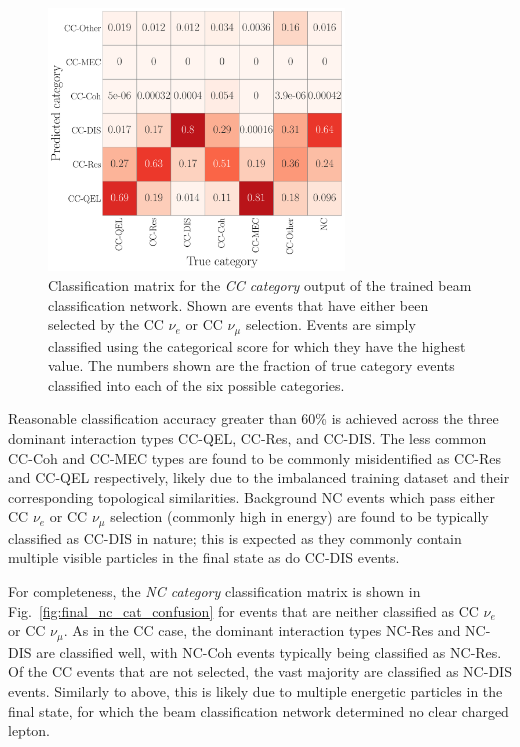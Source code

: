 \begin{figure} %
    \includegraphics[width=0.7\textwidth]{diagrams/7-results/final_cc_cat_confusion.pdf}
    \caption[Classification matrix for the CC category output of the beam classification network]
    {Classification matrix for the \emph{CC category} output of the trained beam classification
        network. Shown are events that have either been selected by the CC $\nu_{e}$ or CC
        $\nu_{\mu}$ selection. Events are simply classified using the categorical score for which
        they have the highest value. The numbers shown are the fraction of true category events
        classified into each of the six possible categories.}
    \label{fig:final_cc_cat_confusion}
\end{figure}

Reasonable classification accuracy greater than 60\% is achieved across the three dominant
interaction types CC-QEL, CC-Res, and CC-DIS. The less common CC-Coh and CC-MEC types are found to
be commonly misidentified as CC-Res and CC-QEL respectively, likely due to the imbalanced training
dataset and their corresponding topological similarities. Background NC events which pass either
CC $\nu_{e}$ or CC $\nu_{\mu}$ selection (commonly high in energy) are found to be typically
classified as CC-DIS in nature; this is expected as they commonly contain multiple visible
particles in the final state as do CC-DIS events.

For completeness, the \emph{NC category} classification matrix is shown in
Fig.~\ref{fig:final_nc_cat_confusion} for events that are neither classified as CC $\nu_{e}$ or CC
$\nu_{\mu}$. As in the CC case, the dominant interaction types NC-Res and NC-DIS are classified
well, with NC-Coh events typically being classified as NC-Res. Of the CC events that are not
selected, the vast majority are classified as NC-DIS events. Similarly to above, this is likely
due to multiple energetic particles in the final state, for which the beam classification network
determined no clear charged lepton.

